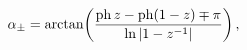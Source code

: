 \[\alpha_{\pm}=\mathop{\mathrm{arctan}\/}\nolimits\!\left(\frac{\mathop{\mathrm{%
ph}\/}\nolimits z-\mathop{\mathrm{ph}\/}\nolimits\!\left(1-z\right)\mp\pi}{%
\mathop{\ln\/}\nolimits|1-z^{-1}|}\right),\]